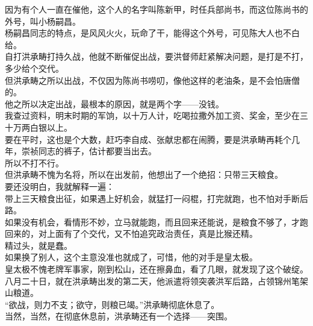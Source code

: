\begin{multicols}{\theparacolNo}
因为有个人一直在催他，这个人的名字叫陈新甲，时任兵部尚书，而这位陈尚书的外号，叫小杨嗣昌。\\

杨嗣昌同志的特点，是风风火火，玩命了干，能得这个外号，可见陈大人也不白给。\\

自打洪承畴打持久战，他就不断催促出战，要洪督师赶紧解决问题，是打是不打，多少给个交代。\\

但洪承畴之所以出战，不仅因为陈尚书唠叨，像他这样的老油条，是不会怕唐僧的。\\

他之所以决定出战，最根本的原因，就是两个字——没钱。\\

我查过资料，明末时期的军饷，以十万人计，吃喝拉撒外加工资、奖金，至少在三十万两白银以上。\\

要在平时，这也是个大数，赶巧李自成、张献忠都在闹腾，要是洪承畴再耗个几年，崇祯同志的裤子，估计都要当出去。\\

所以不打不行。\\

但洪承畴不愧为名将，所以在出发前，他想出了一个绝招：只带三天粮食。\\

要还没明白，我就解释一遍：\\

带上三天粮食出征，如果遇上好机会，就猛打一闷棍，打完就跑，也不怕对手断后路。\\

如果没有机会，看情形不妙，立马就能跑，而且回来还能说，是粮食不够了，才跑回来的，对上面有了个交代，又不怕追究政治责任，真是比猴还精。\\

精过头，就是蠢。\\

如果换了别人，这个主意没准也就成了，可惜，他的对手是皇太极。\\

皇太极不愧老牌军事家，刚到松山，还在擦鼻血，看了几眼，就发现了这个破绽。\\

八月二十日，就在洪承畴出发的第二天，他派遣将领突袭洪军后路，占领锦州笔架山粮道。\\

“欲战，则力不支；欲守，则粮已竭。”洪承畴彻底休息了。\\

当然，当然，在彻底休息前，洪承畴还有一个选择——突围。\\


\end{multicols}

